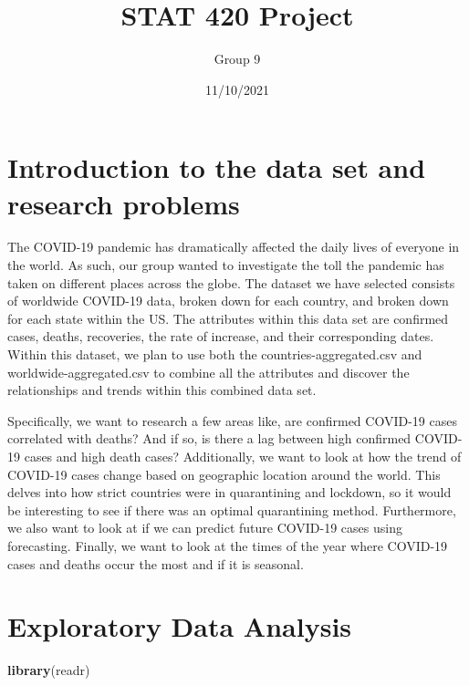 \documentclass[]{article}
\title{STAT 420 Project}
\author{Group 9}
\date{11/10/2021}
\newenvironment{Shaded}{\begin{snugshade}}{\end{snugshade}}
\newcommand{\KeywordTok}[1]{\textcolor[rgb]{0.13,0.29,0.53}{\textbf{#1}}}
\newcommand{\NormalTok}[1]{#1}
\begin{document}
\maketitle

\hypertarget{introduction-to-the-data-set-and-research-problems}{%
\section{Introduction to the data set and research
problems}\label{introduction-to-the-data-set-and-research-problems}}

The COVID-19 pandemic has dramatically affected the daily lives of
everyone in the world. As such, our group wanted to investigate the toll
the pandemic has taken on different places across the globe. The dataset
we have selected consists of worldwide COVID-19 data, broken down for
each country, and broken down for each state within the US. The
attributes within this data set are confirmed cases, deaths, recoveries,
the rate of increase, and their corresponding dates. Within this
dataset, we plan to use both the countries-aggregated.csv and
worldwide-aggregated.csv to combine all the attributes and discover the
relationships and trends within this combined data set.

Specifically, we want to research a few areas like, are confirmed
COVID-19 cases correlated with deaths? And if so, is there a lag between
high confirmed COVID-19 cases and high death cases? Additionally, we
want to look at how the trend of COVID-19 cases change based on
geographic location around the world. This delves into how strict
countries were in quarantining and lockdown, so it would be interesting
to see if there was an optimal quarantining method. Furthermore, we also
want to look at if we can predict future COVID-19 cases using
forecasting. Finally, we want to look at the times of the year where
COVID-19 cases and deaths occur the most and if it is seasonal.

\hypertarget{exploratory-data-analysis}{%
\section{Exploratory Data Analysis}\label{exploratory-data-analysis}}

\begin{Shaded}
\begin{Highlighting}[]
\KeywordTok{library}\NormalTok{(readr)}
\end{Highlighting}
\end{Shaded}
\end{document}
